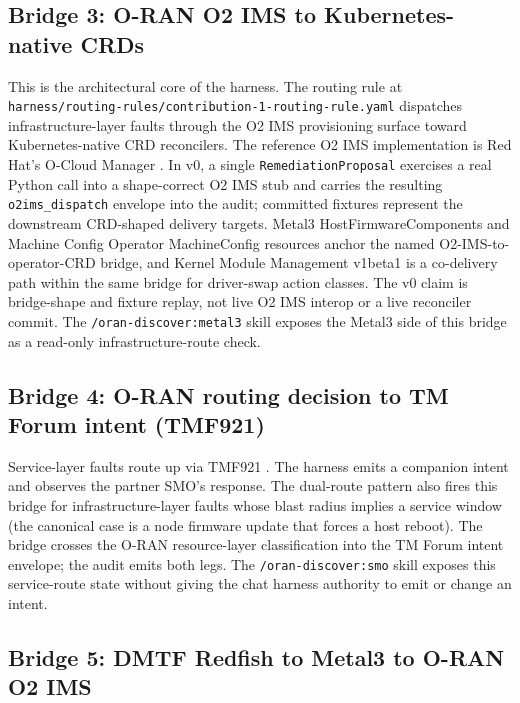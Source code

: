\documentclass[twocolumn,10pt,a4paper]{article}
\begin{document}
\subsection{Bridge 3: O-RAN O2 IMS to Kubernetes-native CRDs}

This is the architectural core of the harness. The routing rule at \texttt{harness/routing-rules/contribution-1-routing-rule.yaml} dispatches infrastructure-layer faults through the O2 IMS provisioning surface \cite{oran_o2_ganp,oran_o2_ims} toward Kubernetes-native CRD reconcilers. The reference O2 IMS implementation is Red Hat's O-Cloud Manager \cite{oran_o2ims_ocm}. In v0, a single \texttt{RemediationProposal} exercises a real Python call into a shape-correct O2 IMS stub and carries the resulting \texttt{o2ims\_dispatch} envelope into the audit; committed fixtures represent the downstream CRD-shaped delivery targets. Metal3 HostFirmwareComponents \cite{metal3_bmo} and Machine Config Operator MachineConfig resources \cite{openshift_mco} anchor the named O2-IMS-to-operator-CRD bridge, and Kernel Module Management v1beta1 \cite{kmm_operator} is a co-delivery path within the same bridge for driver-swap action classes. The v0 claim is bridge-shape and fixture replay, not live O2 IMS interop or a live reconciler commit. The \texttt{/oran-discover:metal3} skill exposes the Metal3 side of this bridge as a read-only infrastructure-route check.

\subsection{Bridge 4: O-RAN routing decision to TM Forum intent (TMF921)}

Service-layer faults route up via TMF921 \cite{tmf921}. The harness emits a companion intent and observes the partner SMO's response. The dual-route pattern also fires this bridge for infrastructure-layer faults whose blast radius implies a service window (the canonical case is a node firmware update that forces a host reboot). The bridge crosses the O-RAN resource-layer classification into the TM Forum intent envelope; the audit emits both legs. The \texttt{/oran-discover:smo} skill exposes this service-route state without giving the chat harness authority to emit or change an intent.

\subsection{Bridge 5: DMTF Redfish to Metal3 to O-RAN O2 IMS}
\end{document}
